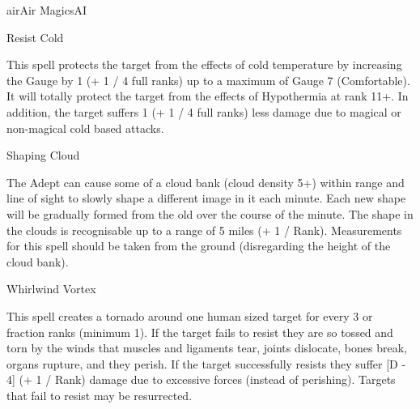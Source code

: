 \begin{college}[2.1]{air}{Air Magics}{AI}
\begin{spell}[S-12]{Resist Cold}

\begin{effects}
This spell protects the target from the effects of cold temperature by
increasing the Gauge by 1 (+ 1 / 4 full ranks) up to a maximum of
Gauge 7 (Comfortable). It will totally protect the target from the
effects of Hypothermia at rank 11+. In addition, the target suffers 1
(+ 1 / 4 full ranks) less damage due to magical or non-magical cold
based attacks.
\end{effects}
\end{spell}

\begin{spell}[S-13]{Shaping Cloud}

\begin{effects}
The Adept can cause some of a cloud bank (cloud density 5+) within
range and line of sight to slowly shape a different image in it
each minute. Each new shape will be gradually formed from the old over
the course of the minute. The shape in the clouds is recognisable up
to a range of 5 miles (+ 1 / Rank).  Measurements for this spell
should be taken from the ground (\ie disregarding the height of the
cloud bank).
\end{effects}
\end{spell}

\begin{spell}[S-14]{Whirlwind Vortex}

\begin{effects}
This spell creates a tornado around one human sized target for every 3
or fraction ranks (minimum 1). If the target fails to resist they are
so tossed and torn by the winds that muscles and ligaments tear,
joints dislocate, bones break, organs rupture, and they perish. If the
target successfully resists they suffer [D - 4] (+ 1 / Rank) damage
due to excessive forces (instead of perishing). Targets that fail to
resist may be resurrected.
\end{effects}
\end{spell}


\end{college}
